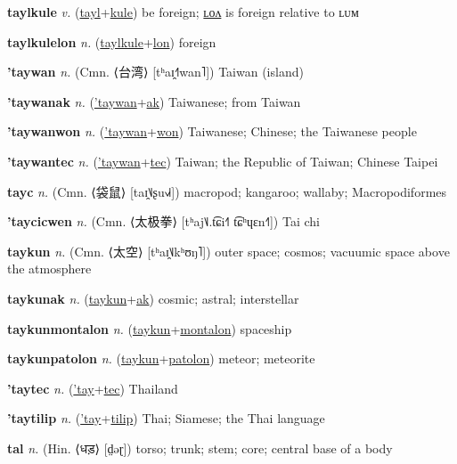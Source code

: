 \textbf{\hypertarget{taylkule}{taylkule}} \textit{v.} (\hyperlink{tayl}{tayl}+\allowbreak \hyperlink{kule}{kule})
be foreign; \hyperlink{taylkulelon}{ʟᴏᴧ} is foreign relative to ʟᴜᴍ

\textbf{\hypertarget{taylkulelon}{taylkulelon}} \textit{n.} (\hyperlink{taylkule}{taylkule}+\allowbreak \hyperlink{lon}{lon})
foreign

\textbf{\hypertarget{'taywan}{'taywan}} \textit{n.} (Cmn. ⟨{\chinese{}台湾}⟩ [tʰaɪ̯˧˥wan˥])
Taiwan (island)

\textbf{\hypertarget{'taywanak}{'taywanak}} \textit{n.} (\hyperlink{'taywan}{'taywan}+\allowbreak \hyperlink{ak}{ak})
Taiwanese; from Taiwan

\textbf{\hypertarget{'taywanwon}{'taywanwon}} \textit{n.} (\hyperlink{'taywan}{'taywan}+\allowbreak \hyperlink{won}{won})
Taiwanese; Chinese; the Taiwanese people

\textbf{\hypertarget{'taywantec}{'taywantec}} \textit{n.} (\hyperlink{'taywan}{'taywan}+\allowbreak \hyperlink{tec}{tec})
Taiwan; the Republic of Taiwan; Chinese Taipei

\textbf{\hypertarget{tayc}{tayc}} \textit{n.} (Cmn. ⟨{\chinese{}袋鼠}⟩ [taɪ̯˥˩ʂu˧˩˧])
macropod; kangaroo; wallaby; Macropodiformes

\textbf{\hypertarget{'taycicwen}{'taycicwen}} \textit{n.} (Cmn. ⟨{\chinese{}太极拳}⟩ [tʰaj˥˩.t͡ɕi˧˥ t͡ɕʰɥɛn˧˥])
Tai chi

\textbf{\hypertarget{taykun}{taykun}} \textit{n.} (Cmn. ⟨{\chinese{}太空}⟩ [tʰaɪ̯˥˩kʰʊŋ˥])
outer space; cosmos; vacuumic space above the atmosphere

\textbf{\hypertarget{taykunak}{taykunak}} \textit{n.} (\hyperlink{taykun}{taykun}+\allowbreak \hyperlink{ak}{ak})
cosmic; astral; interstellar

\textbf{\hypertarget{taykunmontalon}{taykunmontalon}} \textit{n.} (\hyperlink{taykun}{taykun}+\allowbreak \hyperlink{montalon}{montalon})
spaceship

\textbf{\hypertarget{taykunpatolon}{taykunpatolon}} \textit{n.} (\hyperlink{taykun}{taykun}+\allowbreak \hyperlink{patolon}{patolon})
meteor; meteorite

\textbf{\hypertarget{'taytec}{'taytec}} \textit{n.} (\hyperlink{'tay}{'tay}+\allowbreak \hyperlink{tec}{tec})
Thailand

\textbf{\hypertarget{'taytilip}{'taytilip}} \textit{n.} (\hyperlink{'tay}{'tay}+\allowbreak \hyperlink{tilip}{tilip})
Thai; Siamese; the Thai language

\textbf{\hypertarget{tal}{tal}} \textit{n.} (Hin. ⟨{\devanagari{}धड़}⟩ [d̤əɽ])
torso; trunk; stem; core; central base of a body

